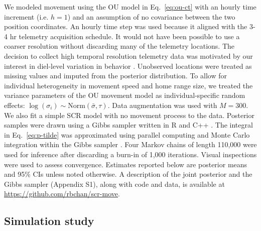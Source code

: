 \documentclass[12pt]{article}
\begin{document}
We modeled movement using the OU model in Eq.~\ref{eq:ou-ct} with an
hourly time increment (i.e. $h=1$) and an assumption of no covariance
between the two position coordinates. An hourly time step was used
because it aligned with the 3-4 hr telemetry acquisition schedule. It
would not have been possible to use a coarser resolution without
discarding many of the telemetry locations.
The decision to collect high temporal resolution telemetry data was
motivated by our interest in diel-level variation in behavior
\citep{crawford_etal:2019}. Unobserved locations were treated as
missing values and imputed from the posterior distribution.
To allow for individual heterogeneity in
movement speed and home range size, we treated the variance parameters
of the OU movement model as individual-specific random effects:
$\log(\sigma_i) \sim \mathrm{Norm}(\bar{\sigma}, \tau)$. Data
augmentation was used with $M=300$. 
We also fit a simple SCR model with no movement process to the data. 
Posterior samples were drawn using a Gibbs sampler written in R and C++ 
\citep{eddelbuettel_sanderson:2014,R:2021}. 
The integral in Eq.~\ref{eq:p-tilde} was approximated using parallel
computing and Monte Carlo integration within the Gibbs
sampler \citep{bonner_schofield:2014}.
Four Markov chains of length 110,000 were used for inference after
discarding a burn-in of 1,000 iterations. Visual inspections were used
to assess convergence. Estimates reported below are
posterior means and 95\% CIs unless noted otherwise.
A description of the joint posterior and the Gibbs sampler (Appendix
S1), along with code and data, is available at
\url{https://github.com/rbchan/scr-move}.  


\subsection{Simulation study}
\end{document}
